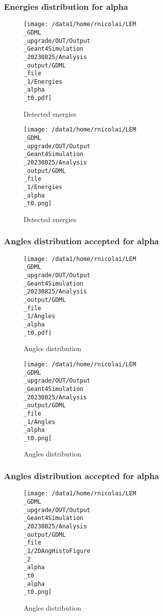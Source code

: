 \documentclass[8pt]{beamer}
\begin{document}
            \begin{frame}
                \frametitle{Energies distribution for alpha}
            
        \begin{figure}[h]
            \centering
            \texttt{[image: /data1/home/rnicolai/LEM\\\_GDML\\\_upgrade/OUT/Output\\\_Geant4Simulation\\\_20230825/Analysis\\\_output/GDML\\\_file\\\_1/Energies\\\_alpha\\\_t0.pdf]}
            \caption{Detected energies}
        \end{figure}
        
        \begin{figure}[h]
            \centering
            \texttt{[image: /data1/home/rnicolai/LEM\\\_GDML\\\_upgrade/OUT/Output\\\_Geant4Simulation\\\_20230825/Analysis\\\_output/GDML\\\_file\\\_1/Energies\\\_alpha\\\_t0.png]}
            \caption{Detected energies}
        \end{figure}
        
            \end{frame}
            
            \begin{frame}
                \frametitle{Angles distribution accepted for alpha}
            
        \begin{figure}[h]
            \centering
            \texttt{[image: /data1/home/rnicolai/LEM\\\_GDML\\\_upgrade/OUT/Output\\\_Geant4Simulation\\\_20230825/Analysis\\\_output/GDML\\\_file\\\_1/Angles\\\_alpha\\\_t0.pdf]}
            \caption{Angles distribution}
        \end{figure}
        
        \begin{figure}[h]
            \centering
            \texttt{[image: /data1/home/rnicolai/LEM\\\_GDML\\\_upgrade/OUT/Output\\\_Geant4Simulation\\\_20230825/Analysis\\\_output/GDML\\\_file\\\_1/Angles\\\_alpha\\\_t0.png]}
            \caption{Angles distribution}
        \end{figure}
        
            \end{frame}
            
            \begin{frame}
                \frametitle{Angles distribution accepted for alpha}
            
        \begin{figure}[h]
            \centering
            \texttt{[image: /data1/home/rnicolai/LEM\\\_GDML\\\_upgrade/OUT/Output\\\_Geant4Simulation\\\_20230825/Analysis\\\_output/GDML\\\_file\\\_1/2DAngHistoFigure\\\_2\\\_alpha\\\_t0\\\_alpha\\\_t0.png]}
            \caption{Angles distribution}
        \end{figure}
        
            \end{frame}
            
\end{document}
